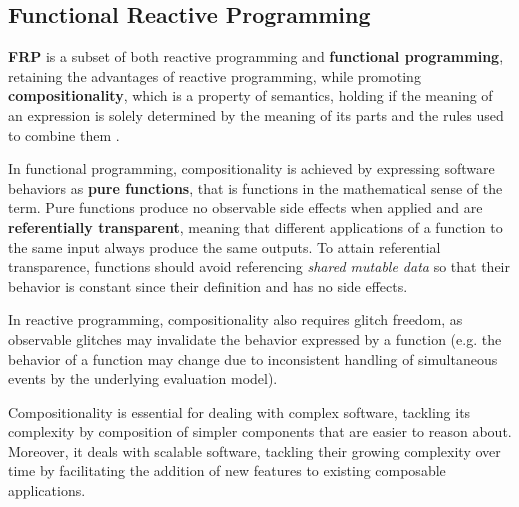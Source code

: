 \subsection{Functional Reactive Programming}

\textbf{\ac{FRP}} is a subset of both reactive programming and
\textbf{functional programming}, retaining the advantages of reactive
programming, while promoting \textbf{compositionality}, which is a
property of semantics, holding if the meaning of an expression is solely
determined by the meaning of its parts and the rules used to combine them
\cite{FRP}.

In functional programming, compositionality is achieved by expressing software
behaviors as \textbf{pure functions}, that is functions in the mathematical
sense of the term. Pure functions produce no observable side effects when
applied and are \textbf{referentially transparent}, meaning that different
applications of a function to the same input always produce the same outputs.
To attain referential transparence, functions should avoid referencing
\textit{shared mutable data} so that their behavior is constant since their
definition and has no side effects.

In reactive programming, compositionality also requires glitch freedom, as
observable glitches may invalidate the behavior expressed by a function (e.g.
the behavior of a function may change due to inconsistent handling of
simultaneous events by the underlying evaluation model).

Compositionality is essential for dealing with complex software, tackling its
complexity by composition of simpler components that are easier to reason
about. Moreover, it deals with scalable software, tackling their growing
complexity over time by facilitating the addition of new features to existing
composable applications.
